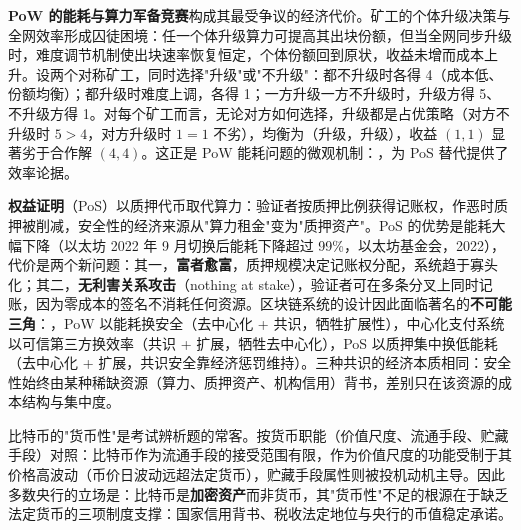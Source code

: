 \textbf{PoW 的能耗与算力军备竞赛}构成其最受争议的经济代价。矿工的个体升级决策与全网效率形成囚徒困境：任一个体升级算力可提高其出块份额，但当全网同步升级时，难度调节机制使出块速率恢复恒定，个体份额回到原状，收益未增而成本上升。设两个对称矿工，同时选择"升级"或"不升级"：都不升级时各得 4（成本低、份额均衡）；都升级时难度上调，各得 1；一方升级一方不升级时，升级方得 5、不升级方得 1。对每个矿工而言，无论对方如何选择，升级都是占优策略（对方不升级时 $5 > 4$，对方升级时 $1 = 1$ 不劣），均衡为（升级，升级），收益 $(1,1)$ 显著劣于合作解 $(4,4)$。这正是 PoW 能耗问题的微观机制：，为 PoS 替代提供了效率论据。

\textbf{权益证明}（PoS）以质押代币取代算力：验证者按质押比例获得记账权，作恶时质押被削减，安全性的经济来源从"算力租金"变为"质押资产"。PoS 的优势是能耗大幅下降（以太坊 2022 年 9 月切换后能耗下降超过 99\%，以太坊基金会，2022），代价是两个新问题：其一，\textbf{富者愈富}，质押规模决定记账权分配，系统趋于寡头化；其二，\textbf{无利害关系攻击}（nothing at stake），验证者可在多条分叉上同时记账，因为零成本的签名不消耗任何资源。区块链系统的设计因此面临著名的\textbf{不可能三角}：，PoW 以能耗换安全（去中心化 + 共识，牺牲扩展性），中心化支付系统以可信第三方换效率（共识 + 扩展，牺牲去中心化），PoS 以质押集中换低能耗（去中心化 + 扩展，共识安全靠经济惩罚维持）。三种共识的经济本质相同：安全性始终由某种稀缺资源（算力、质押资产、机构信用）背书，差别只在该资源的成本结构与集中度。

比特币的"货币性"是考试辨析题的常客。按货币职能（价值尺度、流通手段、贮藏手段）对照：比特币作为流通手段的接受范围有限，作为价值尺度的功能受制于其价格高波动（币价日波动远超法定货币），贮藏手段属性则被投机动机主导。因此多数央行的立场是：比特币是\textbf{加密资产}而非货币，其"货币性"不足的根源在于缺乏法定货币的三项制度支撑：国家信用背书、税收法定地位与央行的币值稳定承诺。

